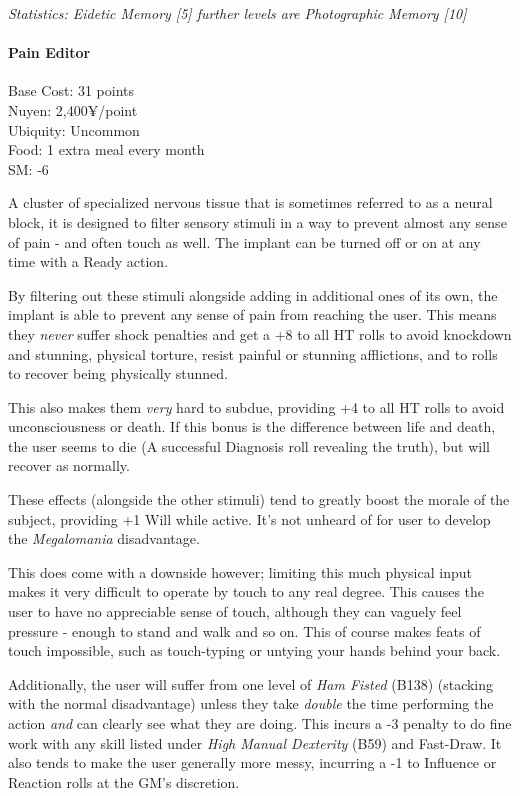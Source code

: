 \begin{multicols*}{3}
	\textit{\textcolor{OliveGreen}{Statistics: Eidetic Memory [5] further levels are Photographic Memory [10]}}
	
	\paragraph{Pain Editor}\label{pain_editor}
	\begin{flushright}
		Base Cost: 31 points\\
		Nuyen: 2,400¥/point\\
		Ubiquity: Uncommon\\
		Food: 1 extra meal every month\\
		SM: -6\\
	\end{flushright}

	A cluster of specialized nervous tissue that is sometimes referred to as a neural block, it is designed to filter sensory stimuli in a way to prevent almost any sense of pain - and often touch as well. The implant can be turned off or on at any time with a Ready action.
	
	By filtering out these stimuli alongside adding in additional ones of its own, the implant is able to prevent any sense of pain from reaching the user. This means they \textit{never} suffer shock penalties and get a +8 to all HT rolls to avoid knockdown and stunning, physical torture, resist painful or stunning afflictions, and to rolls to recover being physically stunned. 
	
	This also makes them \textit{very} hard to subdue, providing +4 to all HT rolls to avoid unconsciousness or death. If this bonus is the difference between life and death, the user seems to die (A successful Diagnosis roll revealing the truth), but will recover as normally.
	
	These effects (alongside the other stimuli) tend to greatly boost the morale of the subject, providing +1 Will while active. It's not unheard of for user to develop the \textit{Megalomania} disadvantage.
	
	This does come with a downside however; limiting this much physical input makes it very difficult to operate by touch to any real degree. This causes the user to have no appreciable sense of touch, although they can vaguely feel pressure - enough to stand and walk and so on. This of course makes feats of touch impossible, such as touch-typing or untying your hands behind your back. 
	
	Additionally, the user will suffer from one level of \textit{Ham Fisted} (B138) (stacking with the normal disadvantage) unless they take \textit{double} the time performing the action \textit{and} can clearly see what they are doing. This incurs a -3 penalty to do fine work with any skill listed under \textit{High Manual Dexterity} (B59) and Fast-Draw. It also tends to make the user generally more messy, incurring a -1 to Influence or Reaction rolls at the GM's discretion.
	

\end{multicols*}
